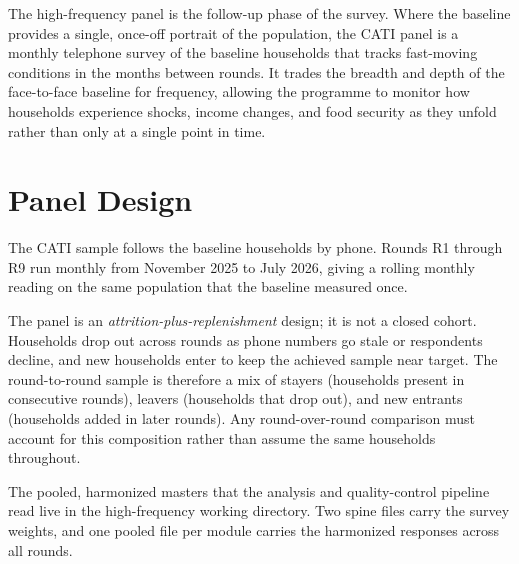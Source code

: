 
The high-frequency panel is the follow-up phase of the survey. Where the baseline
provides a single, once-off portrait of the population, the CATI panel is a monthly
telephone survey of the baseline households that tracks fast-moving conditions in the
months between rounds. It trades the breadth and depth of the face-to-face baseline for
frequency, allowing the programme to monitor how households experience shocks, income
changes, and food security as they unfold rather than only at a single point in time.

\section{Panel Design}

The CATI sample follows the baseline households by phone. Rounds R1 through R9 run
monthly from November 2025 to July 2026, giving a rolling monthly reading on the same
population that the baseline measured once.

The panel is an \emph{attrition-plus-replenishment} design; it is not a closed cohort.
Households drop out across rounds as phone numbers go stale or respondents decline, and
new households enter to keep the achieved sample near target. The round-to-round sample
is therefore a mix of stayers (households present in consecutive rounds), leavers
(households that drop out), and new entrants (households added in later rounds). Any
round-over-round comparison must account for this composition rather than assume the same
households throughout.

The pooled, harmonized masters that the analysis and quality-control pipeline read live
in the high-frequency working directory. Two spine files carry the survey weights, and one
pooled file per module carries the harmonized responses across all rounds.

